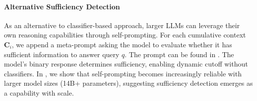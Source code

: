 \paragraph{Alternative Sufficiency Detection}
\label{sec:self_prompt}
As an alternative to classifier-based approach, larger LLMs can leverage their own reasoning capabilities through self-prompting. For each cumulative context $\mathbf{C}_i$, we append a meta-prompt asking the model to evaluate whether it has sufficient information to answer query $q$. The prompt can be found in . The model's binary response determines sufficiency, enabling dynamic cutoff without classifiers. In , we show that self-prompting becomes increasingly reliable with larger model sizes (14B+ parameters), suggesting sufficiency detection emerges as a capability with scale.



